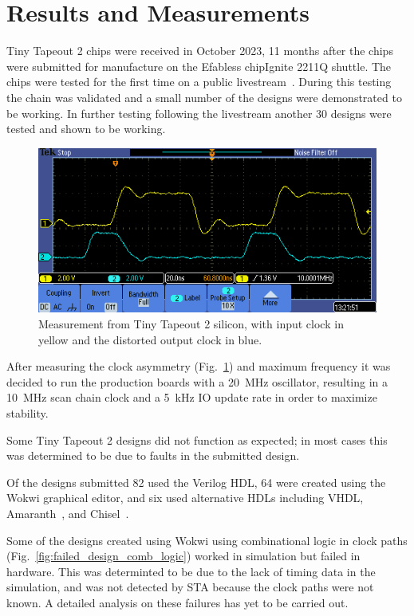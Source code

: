 \section{Results and Measurements}
\label{sec:results}

Tiny Tapeout 2 chips were received in October 2023, 11 months after the chips were submitted for manufacture on the Efabless chipIgnite 2211Q shuttle.
The chips were tested for the first time on a public livestream~\cite{siliconalive}.
During this testing the chain was validated and a small number of the designs were demonstrated to be working.
In further testing following the livestream another 30 designs were tested and shown to be working.

\begin{figure}[!t]
\centering
\includegraphics[width=\columnwidth]{./Figs/tt02_clock_out.png}
\caption{Measurement from Tiny Tapeout 2 silicon, with input clock in yellow and the distorted output clock in blue.}
\label{fig:TT02_clock_out}
\end{figure}

After measuring the clock asymmetry (Fig.~\ref{fig:TT02_clock_out}) and maximum frequency it was decided to run the production boards with a \qty{20}{\MHz} oscillator, resulting in a \qty{10}{\MHz} scan chain clock and a \qty{5}{\kHz} IO update rate in order to maximize stability.

Some Tiny Tapeout 2 designs did not function as expected; in most cases this was determined to be due to faults in the submitted design.

Of the designs submitted 82 used the Verilog HDL, 64 were created using the Wokwi graphical editor, and six used alternative HDLs including VHDL, Amaranth~\cite{amaranth}, and Chisel~\cite{chisel}.

Some of the designs created using Wokwi using combinational logic in clock paths (Fig.~\ref{fig:failed_design_comb_logic}) worked in simulation but failed in hardware.
This was determinted to be due to the lack of timing data in the simulation, and was not detected by STA because the clock paths were not known. A detailed analysis on these failures has yet to be carried out.

